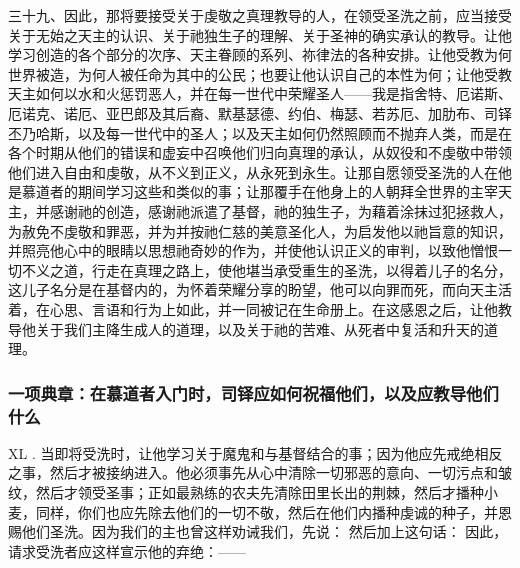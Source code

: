 三十九、因此，那将要接受关于虔敬之真理教导的人，在领受圣洗之前，应当接受关于无始之天主的认识、关于祂独生子的理解、关于圣神的确实承认的教导。让他学习创造的各个部分的次序、天主眷顾的系列、祢律法的各种安排。让他受教为何世界被造，为何人被任命为其中的公民；也要让他认识自己的本性为何；让他受教天主如何以水和火惩罚恶人，并在每一世代中荣耀圣人——我是指舍特、厄诺斯、厄诺克、诺厄、亚巴郎及其后裔、默基瑟德、约伯、梅瑟、若苏厄、加肋布、司铎丕乃哈斯，以及每一世代中的圣人；以及天主如何仍然照顾而不抛弃人类，而是在各个时期从他们的错误和虚妄中召唤他们归向真理的承认，从奴役和不虔敬中带领他们进入自由和虔敬，从不义到正义，从永死到永生。让那自愿领受圣洗的人在他是慕道者的期间学习这些和类似的事；让那覆手在他身上的人朝拜全世界的主宰天主，并感谢祂的创造，感谢祂派遣了基督，祂的独生子，为藉着涂抹过犯拯救人，为赦免不虔敬和罪恶，并为并按祂仁慈的美意圣化人，为启发他以祂旨意的知识，并照亮他心中的眼睛以思想祂奇妙的作为，并使他认识正义的审判，以致他憎恨一切不义之道，行走在真理之路上，使他堪当承受重生的圣洗，以得着儿子的名分，这儿子名分是在基督内的，为怀着荣耀分享的盼望，他可以向罪而死，而向天主活着，在心思、言语和行为上如此，并一同被记在生命册上。在这感恩之后，让他教导他关于我们主降生成人的道理，以及关于祂的苦难、从死者中复活和升天的道理。\par


\subsubsection{一项典章：在慕道者入门时，司铎应如何祝福他们，以及应教导他们什么}

XL . 当即将受洗时，让他学习关于魔鬼和与基督结合的事；因为他应先戒绝相反之事，然后才被接纳进入。他必须事先从心中清除一切邪恶的意向、一切污点和皱纹，然后才领受圣事；正如最熟练的农夫先清除田里长出的荆棘，然后才播种小麦，同样，你们也应先除去他们的一切不敬，然后在他们内播种虔诚的种子，并恩赐他们圣洗。因为我们的主也曾这样劝诫我们，先说： 然后加上这句话： 因此，请求受洗者应这样宣示他的弃绝：——\par


